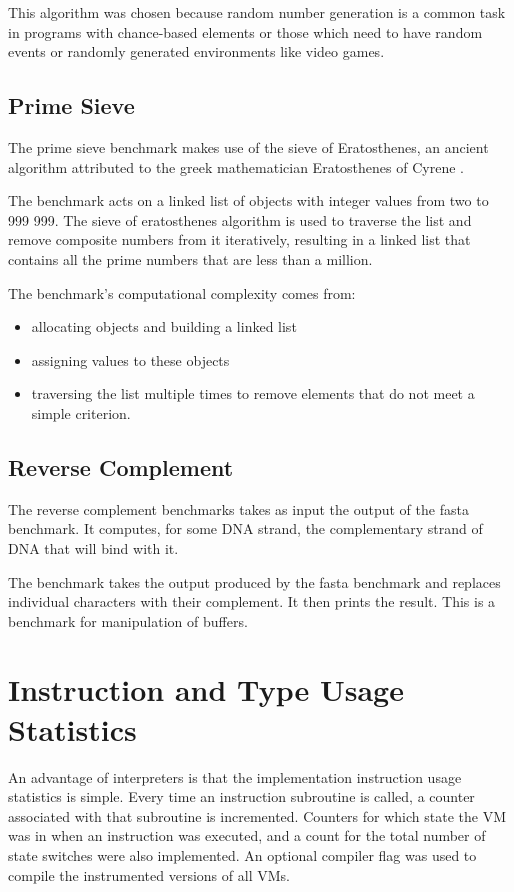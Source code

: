 \documentclass[english,a4paper,12pt]{report}
\begin{document}
This algorithm was chosen because random number generation is a common
task in programs with chance-based elements or those which need to
have random events or randomly generated environments like video
games.

\subsection{Prime Sieve}

The prime sieve benchmark makes use of the sieve of Eratosthenes, an
ancient algorithm attributed to the greek mathematician Eratosthenes
of Cyrene \cite{sieve}.

The benchmark acts on a linked list of objects with integer values
from two to 999 999. The sieve of eratosthenes algorithm is used to
traverse the list and remove composite numbers from it iteratively,
resulting in a linked list that contains all the prime numbers that
are less than a million.

The benchmark's computational complexity comes from:
\begin{itemize}
\item allocating objects and building a linked list
\item assigning values to these objects
\item traversing the list multiple times to remove elements that do
  not meet a simple criterion.
\end{itemize}
\subsection{Reverse Complement}

The reverse complement benchmarks takes as input the output of the
fasta benchmark. It computes, for some DNA strand, the complementary
strand of DNA that will bind with it. 

The benchmark takes the output produced by the fasta benchmark and
replaces individual characters with their complement. It then prints
the result. This is a benchmark for manipulation of buffers.

\section{Instruction and Type Usage Statistics}

An advantage of interpreters is that the implementation instruction
usage statistics is simple. Every time an instruction subroutine is
called, a counter associated with that subroutine is
incremented. Counters for which state the VM was in when an
instruction was executed, and a count for the total number of state
switches were also implemented. An optional compiler flag was used to
compile the instrumented versions of all VMs.
\end{document}
